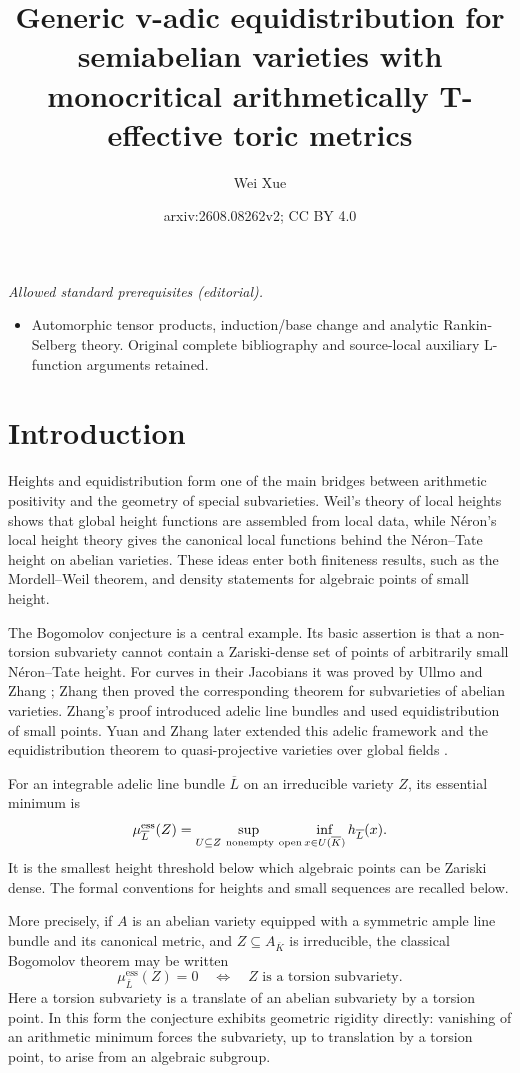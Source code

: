 \documentclass[10pt,a4paper]{amsart}
\title{Generic v-adic equidistribution for semiabelian varieties with monocritical arithmetically T-effective toric metrics}
\author{Wei Xue}
\date{arxiv:2608.08262v2; CC BY 4.0}
\theoremstyle{plain}
\theoremstyle{plain}
\numberwithin{equation}{section}
\begin{document}
\maketitle
\noindent\textit{Allowed standard prerequisites (editorial).}\begin{itemize}
\item Automorphic tensor products, induction/base change and analytic Rankin-Selberg theory. Original complete bibliography and source-local auxiliary L-function arguments retained.
\end{itemize}\medskip
\section{Introduction}

Heights and equidistribution form one of the main bridges between arithmetic
positivity and the geometry of special subvarieties.  Weil's theory of local
heights \cite{We} shows that global height functions are assembled from local
data, while N\'eron's local height theory \cite{Ne} gives the canonical local
functions behind the N\'eron--Tate height on abelian varieties.  These ideas
enter both finiteness results, such as the Mordell--Weil theorem, and
density statements for algebraic points of small height.

The Bogomolov conjecture is a central example.  Its basic assertion is that a
non-torsion subvariety cannot contain a Zariski-dense set of points of
arbitrarily small N\'eron--Tate height.  For curves in their Jacobians it was
proved by Ullmo \cite{Ull} and Zhang \cite{Zha}; Zhang then proved the
corresponding theorem for subvarieties of abelian varieties.  Zhang's proof introduced adelic line
bundles and used equidistribution of small points.  Yuan and Zhang later
extended this adelic framework and the equidistribution theorem to
quasi-projective varieties over global fields \cite{YZ}.

For an integrable adelic line bundle \(\overline L\) on an irreducible
variety \(Z\), its essential minimum is
\[
\mu^{\mathrm{ess}}_{\overline L}(Z)
=\sup_{U\subseteq Z\ {\rm nonempty\ open}}
\inf_{x\in U(\overline K)}h_{\overline L}(x).
\]
It is the smallest height threshold below which algebraic points can be
Zariski dense.  The formal conventions for heights and small sequences are
recalled below.

More precisely, if \(A\) is an abelian variety equipped with a symmetric
ample line bundle and its canonical metric, and \(Z\subseteq A_{\overline K}\)
is irreducible, the classical Bogomolov theorem may be written
\[
\mu^{\mathrm{ess}}_{\overline L}(Z)=0
\quad\Longleftrightarrow\quad
Z\text{ is a torsion subvariety}.
\]
Here a torsion subvariety is a translate of an abelian subvariety by a torsion
point.  In this form the conjecture exhibits geometric rigidity directly:
vanishing of an arithmetic minimum forces the subvariety, up to translation
by a torsion point, to arise from an algebraic subgroup.
\end{document}
